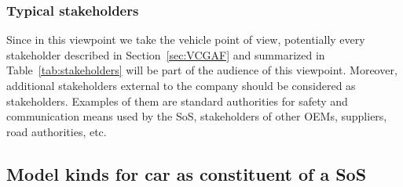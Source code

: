 \subsubsection{Typical stakeholders} 

Since in this viewpoint we take the vehicle point of view, potentially every stakeholder described in Section~\ref{sec:VCGAF} and summarized in Table~\ref{tab:stakeholders} will be part of the audience of this viewpoint. Moreover, additional stakeholders external to the company should be considered as stakeholders. Examples of them are standard authorities for safety and communication means used by the SoS, stakeholders of other OEMs, suppliers, road authorities, etc.

%
%

%
%
%



\subsection{Model kinds for car as constituent of a SoS}\label{mk:list}

